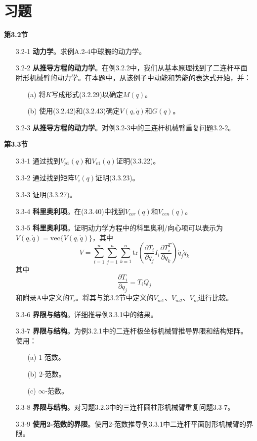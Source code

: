 \documentclass[12pt,a4paper]{ctexart}
\begin{document}
\section{习题}

\textbf{第3.2节}

\begin{enumerate}
\item[3.2-1] \textbf{动力学}。求例A.2-4中球腕的动力学。

\item[3.2-2] \textbf{从推导方程的动力学}。在例3.2.2中，我们从基本原理找到了二连杆平面肘形机械臂的动力学。在本题中，从该例子中动能和势能的表达式开始，并：
\begin{enumerate}
\item[(a)] 将$K$写成形式(3.2.29)以确定$M(q)$。
\item[(b)] 使用(3.2.42)和(3.2.43)确定$V(q,\dot{q})$和$G(q)$。
\end{enumerate}

\item[3.2-3] \textbf{从推导方程的动力学}。对例3.2-3中的三连杆机械臂重复问题3.2-2。
\end{enumerate}

\textbf{第3.3节}

\begin{enumerate}
\item[3.3-1] 通过找到$V_{p1}(q)$和$V_{v1}(q)$证明(3.3.22)。

\item[3.3-2] 通过找到矩阵$V_i(q)$证明(3.3.23)。

\item[3.3-3] 证明(3.3.27)。

\item[3.3-4] \textbf{科里奥利项}。在(3.3.40)中找到$V_{cor}(q)$和$V_{cen}(q)$。

\item[3.3-5] \textbf{科里奥利项}。证明动力学方程中的科里奥利/向心项可以表示为$V(q,\dot{q}) = \text{vec}\{V(q,\dot{q})\}$，其中
\[ V = \sum_{i=1}^{n} \sum_{j=1}^{n} \sum_{k=1}^{n} \text{tr}\left(\frac{\partial T_i}{\partial q_j}I_i\frac{\partial T_i^T}{\partial q_k}\right)\dot{q}_j\dot{q}_k \]
其中
\[ \frac{\partial T_i}{\partial q_j} = T_i Q_j \]
和附录A中定义的$T_i$。将其与第3.2节中定义的$V_{m1}$、$V_{m2}$、$V_m$进行比较。

\item[3.3-6] \textbf{界限与结构}。详细推导例3.3.1中的结果。

\item[3.3-7] \textbf{界限与结构}。为例3.2.1中的二连杆极坐标机械臂推导界限和结构矩阵。使用：
\begin{enumerate}
\item[(a)] 1-范数。
\item[(b)] 2-范数。
\item[(c)] $\infty$-范数。
\end{enumerate}

\item[3.3-8] \textbf{界限与结构}。对习题3.2.3中的三连杆圆柱形机械臂重复问题3.3-7。

\item[3.3-9] \textbf{使用2-范数的界限}。使用2-范数推导例3.3.1中二连杆平面肘形机械臂的界限。
\end{enumerate}
\end{document}
